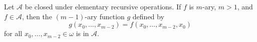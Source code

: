 Let $\mathcal{A}$ be closed under elementary recursive operations. If $f$ is $m$-ary, $m>1$, and $f\in\mathcal{A}$, then the $(m-1)$-ary function $g$ defined by
$$g(x_0,\ldots,x_{m-2}) = f(x_0,\ldots,x_{m-2}, x_0)$$
for all $x_0,\ldots,x_{m-2}\in\omega$ is in $\mathcal{A}$.
